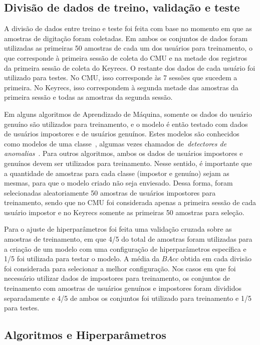 \subsection{Divisão de dados de treino, validação e teste}\label{subsec:train_test_division}

A divisão de dados entre treino e teste foi feita com base no momento em que as amostras de digitação foram coletadas. Em ambos os conjuntos de dados foram utilizadas as primeiras 50 amostras de cada um dos usuários para treinamento, o que corresponde à primeira sessão de coleta do CMU e na metade dos registros da primeira sessão de coleta do Keyrecs. O restante dos dados de cada usuário foi utilizado para testes. No CMU, isso corresponde às 7 sessões que sucedem a primeira. No Keyrecs, isso correspondem à segunda metade das amostras da primeira sessão e todas as amostras da segunda sessão.   

Em alguns algoritmos de Aprendizado de Máquina, somente os dados do usuário genuíno são utilizados para treinamento, e o modelo é então testado com dados de usuários impostores e de usuários genuínos. Estes modelos são conhecidos como modelos de uma classe~\cite{Khan_Madden_2014}, algumas vezes chamados de~\textit{detectores de anomalias}~\cite{Killourhy2009}. Para outros algoritmos, ambos os dados de usuários impostores e genuínos devem ser utilizados para treinamento. Nesse sentido, é importante que a quantidade de amostras para cada classe (impostor e genuíno) sejam as mesmas, para que o modelo criado não seja enviesado. Dessa forma, foram selecionadas aleatoriamente 50 amostras de usuários impostores para treinamento, sendo que no CMU foi considerada apenas a primeira sessão de cada usuário impostor e no Keyrecs somente as primeiras 50 amostras para seleção.

Para o ajuste de hiperparâmetros foi feita uma validação cruzada sobre as amostras de treinamento, em que 4/5 do total de amostras foram utilizadas para a criação de um modelo com uma configuração de hiperparâmetros específica e 1/5 foi utilizada para testar o modelo. A média da $BAcc$ obtida em cada divisão foi considerada para selecionar a melhor configuração. Nos casos em que foi necessário utilizar dados de impostores para treinamento, os conjuntos de treinamento com amostras de usuários genuínos e impostores foram divididos separadamente e 4/5 de ambos os conjuntos foi utilizado para treinamento e 1/5 para testes.


\subsection{Algoritmos e Hiperparâmetros}\label{subsec:algs_e_hps}

